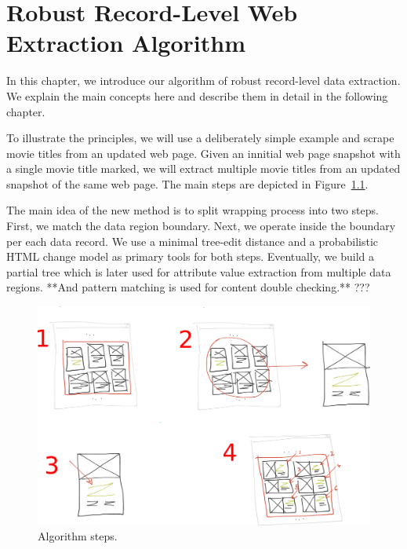 \chapter{Robust Record-Level Web Extraction Algorithm}

In this chapter, we introduce our algorithm of robust record-level data extraction. We explain the main concepts here and describe them in detail in the following chapter. 

To illustrate the principles, we will use a deliberately simple example and scrape movie titles from an updated web page. Given an innitial web page snapshot with a single movie title marked, we will extract multiple movie titles from an updated snapshot of the same web page. The main steps are depicted in Figure~\ref{fig:algorithm}.

The main idea of the new method is to split wrapping process into two steps. First, we match the data region boundary. Next, we operate inside the boundary per each data record. We use a minimal tree-edit distance and a probabilistic HTML change model as primary tools for both steps. Eventually, we build a partial tree which is later used for attribute value extraction from multiple data regions. **And pattern matching is used for content double checking.** ???

\begin{figure}[h]
	\centering
	\includegraphics[width=1.0\textwidth]{figures/algorithm}
	\caption{Algorithm steps.}
	\label{fig:algorithm}
\end{figure}


